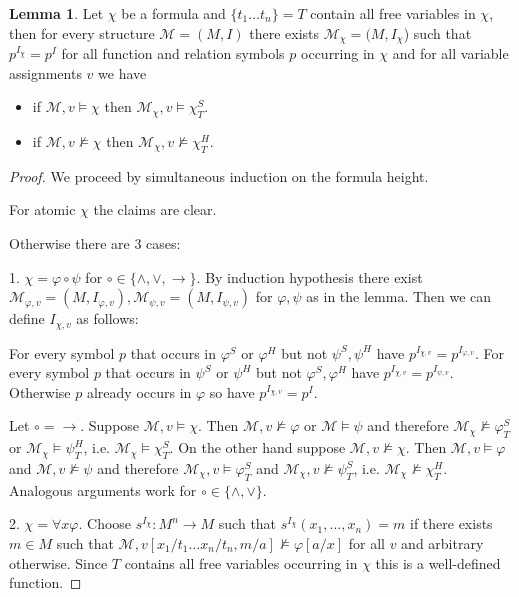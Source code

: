 \documentclass[a4paper,12pt]{report}
\theoremstyle{definition}
\theoremstyle{definition}
\theoremstyle{definition}
\newtheorem{lemma}[theorem]{Lemma}
\theoremstyle{definition}
\theoremstyle{definition}
\theoremstyle{definition}
\theoremstyle{definition}
\begin{document}
	\begin{lemma}
		Let $\chi$ be a formula and $\{t_1\dots t_n\} = T$ contain all free variables in $\chi$, then for every structure $\mathcal M = (M, I)$ there exists $\mathcal M_\chi = (M, I_\chi$) such that $p^{I_{\chi}} = p^I$ for all function and relation symbols $p$ occurring in $\chi$ and for all variable assignments $v$ we have
		\begin{itemize}
			\item if $\mathcal M, v\models\chi$ then $\mathcal M_\chi, v\models\chi^S_T$.
			\item if $\mathcal M, v\not\models\chi$ then $\mathcal M_\chi, v\not\models\chi^H_T$.
		\end{itemize}
	\end{lemma}
	
	\begin{proof}
		We proceed by simultaneous induction on the formula height.
		
		For atomic $\chi$ the claims are clear.
		
		Otherwise there are $3$ cases:
		
		1. $\chi = \varphi\circ\psi$ for $\circ\in\{\wedge,\vee,\to\}$. By induction hypothesis there exist $\mathcal M_{\varphi, v} = (M, I_{\varphi, v}), \mathcal M_{\psi, v} = (M, I_{\psi, v})$ for $\varphi,\psi$ as in the lemma. Then we can define $I_{\chi, v}$ as follows:
		
		For every symbol $p$ that occurs in $\varphi^S$ or $\varphi^H$ but not $\psi^S, \psi^H$ have $p^{I_{\chi, v}} = p^{I_{\varphi, v}}$. For every symbol $p$ that occurs in $\psi^S$ or $\psi^H$ but not $\varphi^S, \varphi^H$ have $p^{I_{\chi, v}} = p^{I_{\psi, v}}$. Otherwise $p$ already occurs in $\varphi$ so have $p^{I_{\chi, v}} = p^I$.
		
		Let $\circ=\to$. Suppose $\mathcal M, v\models\chi$. Then $\mathcal M, v\not\models\varphi$ or $\mathcal M\models\psi$ and therefore $\mathcal M_\chi\not\models\varphi^S_T$ or $\mathcal M_\chi\models\psi^H_T$, i.e. $\mathcal M_\chi\models\chi^S_T$. On the other hand suppose $\mathcal M, v\not\models\chi$. Then $\mathcal M, v\models\varphi$ and $\mathcal M, v\not\models\psi$ and therefore $\mathcal M_\chi, v\models \varphi^S_T$ and $\mathcal M_\chi, v\not\models\psi^S_T$, i.e. $\mathcal M_\chi\not\models\chi^H_T$. Analogous arguments work for $\circ\in\{\wedge, \vee\}$.
		 
		2. $\chi = \forall x\varphi$. Choose $s^{I_\chi}:M^n\to M$ such that $s^{I_\chi}(x_1,\dots, x_n) = m$ if there exists $m\in M$ such that $\mathcal M, v[x_1/t_1\dots x_n/t_n, m/a]\not\models\varphi[a/x]$ for all $v$ and arbitrary otherwise. Since $T$ contains all free variables occurring in $\chi$ this is a well-defined function.
		 

\end{proof}
\end{document}
